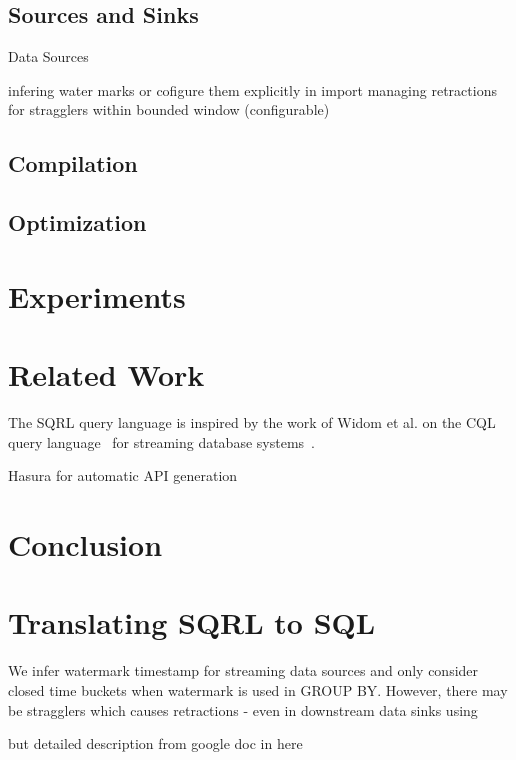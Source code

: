\documentclass[	DIV=calc,%
							paper=letter,%
							fontsize=11pt,%
							twocolumn]{scrartcl}	 					%
\begin{document}
\subsection{Sources and Sinks}
\label{sec:datasqrl-source}
Data Sources

infering water marks or cofigure them explicitly in import
managing retractions for stragglers within bounded window (configurable)

\subsection{Compilation}
\label{sec:compilation}

\subsection{Optimization}
\label{sec:optimization}


\section{Experiments}
\label{sec:experiments}


\section{Related Work}
\label{sec:related}

The SQRL query language is inspired by the work of Widom et al. on the CQL query language~\cite{arasu_cql_2006} for streaming database systems~\cite{arasu_stream_2016}.

Hasura for automatic API generation

\section{Conclusion}
\label{sec:conclusion}



\appendix

\section{Translating SQRL to SQL}
\label{appendix:sqrl2sql}

We infer watermark timestamp for streaming data sources and only consider closed time buckets when watermark is used in GROUP BY. However, there may be stragglers which causes retractions - even in downstream data sinks using

but detailed description from google doc in here
\end{document}
